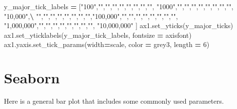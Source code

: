\documentclass[]{book}
\newenvironment{Shaded}{\begin{snugshade}}{\end{snugshade}}
\newcommand{\DecValTok}[1]{\textcolor[rgb]{0.00,0.00,0.81}{#1}}
\newcommand{\StringTok}[1]{\textcolor[rgb]{0.31,0.60,0.02}{#1}}
\newcommand{\OperatorTok}[1]{\textcolor[rgb]{0.81,0.36,0.00}{\textbf{#1}}}
\newcommand{\NormalTok}[1]{#1}
\begin{document}
\begin{Shaded}
\begin{Highlighting}[]
\NormalTok{y_major_tick_labels }\OperatorTok{=}\NormalTok{ [}\StringTok{"100"}\NormalTok{,}\StringTok{""}\NormalTok{,}\StringTok{""}\NormalTok{,}\StringTok{""}\NormalTok{,}\StringTok{""}\NormalTok{,}\StringTok{""}\NormalTok{,}\StringTok{""}\NormalTok{,}\StringTok{""}\NormalTok{,}\StringTok{""}\NormalTok{, }\StringTok{"1000"}\NormalTok{,}\StringTok{""}\NormalTok{,}\StringTok{""}\NormalTok{,}\StringTok{""}\NormalTok{,}\StringTok{""}\NormalTok{,}\StringTok{""}\NormalTok{,}\StringTok{""}\NormalTok{,}\StringTok{""}\NormalTok{,}\StringTok{""}\NormalTok{, }\StringTok{"10,000"}\NormalTok{,}\OperatorTok{\textbackslash{}}
                       \StringTok{""}\NormalTok{,}\StringTok{""}\NormalTok{,}\StringTok{""}\NormalTok{,}\StringTok{""}\NormalTok{,}\StringTok{""}\NormalTok{,}\StringTok{""}\NormalTok{,}\StringTok{""}\NormalTok{,}\StringTok{""}\NormalTok{,}\StringTok{"100,000"}\NormalTok{,}\StringTok{""}\NormalTok{,}\StringTok{""}\NormalTok{,}\StringTok{""}\NormalTok{,}\StringTok{""}\NormalTok{,}\StringTok{""}\NormalTok{,}\StringTok{""}\NormalTok{,}\StringTok{""}\NormalTok{,}\StringTok{""}\NormalTok{, }\StringTok{"1,000,000"}\NormalTok{,}\StringTok{""}\NormalTok{,}\StringTok{""}\NormalTok{,}\StringTok{""}\NormalTok{,}\StringTok{""}\NormalTok{,}\StringTok{""}\NormalTok{,}\StringTok{""}\NormalTok{,}\StringTok{""}\NormalTok{,}\StringTok{""}\NormalTok{, }\StringTok{"10,000,000"}\NormalTok{ ]}
\NormalTok{ax1.set_yticks(y_major_ticks)}
\NormalTok{ax1.set_yticklabels(y_major_tick_labels, fontsize }\OperatorTok{=}\NormalTok{ axisfont)}
\NormalTok{ax1.yaxis.set_tick_params(width}\OperatorTok{=}\NormalTok{scale, color }\OperatorTok{=}\NormalTok{ grey3, length }\OperatorTok{=} \DecValTok{6}\NormalTok{)}
\end{Highlighting}
\end{Shaded}

\section{Seaborn}\label{seaborn}

Here is a general bar plot that includes some commonly used parameters.
\end{document}
